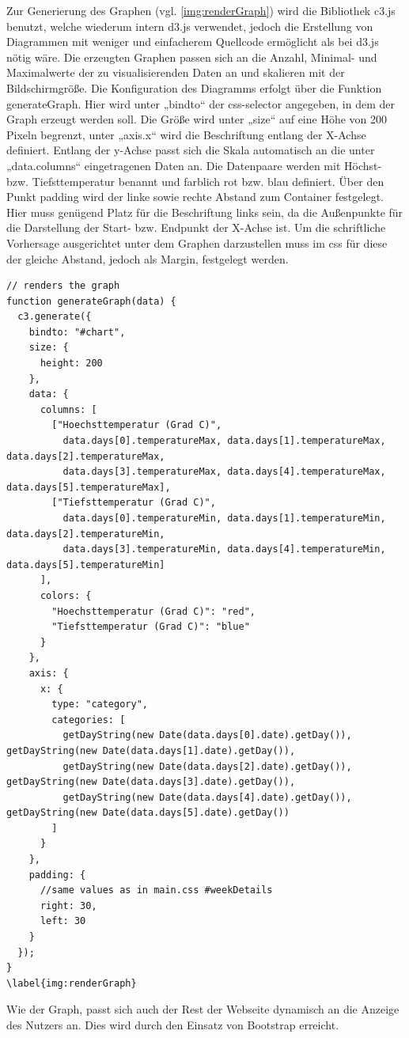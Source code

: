 Zur Generierung des Graphen (vgl. \ref{img:renderGraph}) wird die Bibliothek c3.js benutzt, welche wiederum intern d3.js verwendet, jedoch die Erstellung von Diagrammen mit weniger und einfacherem Quellcode ermöglicht als bei d3.js nötig wäre. Die erzeugten Graphen passen sich an die Anzahl, Minimal- und Maximalwerte der zu visualisierenden Daten an und skalieren mit der Bildschirmgröße. Die Konfiguration des Diagramms erfolgt über die Funktion generateGraph. Hier wird unter „bindto“ der css-selector angegeben, in dem der Graph erzeugt werden soll. Die Größe wird unter „size“ auf eine Höhe von 200 Pixeln begrenzt, unter „axis.x“ wird die Beschriftung entlang der X-Achse definiert. Entlang der y-Achse passt sich die Skala automatisch an die unter „data.columns“ eingetragenen Daten an. Die Datenpaare werden mit Höchst- bzw. Tiefsttemperatur benannt und farblich rot bzw. blau definiert. Über den Punkt padding wird der linke sowie rechte Abstand zum Container festgelegt. Hier muss genügend Platz für die Beschriftung links sein, da die Außenpunkte für die Darstellung der Start- bzw. Endpunkt der X-Achse ist. Um die schriftliche Vorhersage ausgerichtet unter dem Graphen darzustellen muss im css für diese der gleiche Abstand, jedoch als Margin, festgelegt werden.

\begin{lstlisting} 
// renders the graph
function generateGraph(data) {
  c3.generate({
    bindto: "#chart",
    size: {
      height: 200
    },
    data: {
      columns: [
        ["Hoechsttemperatur (Grad C)",
          data.days[0].temperatureMax, data.days[1].temperatureMax, data.days[2].temperatureMax,
          data.days[3].temperatureMax, data.days[4].temperatureMax, data.days[5].temperatureMax],
        ["Tiefsttemperatur (Grad C)",
          data.days[0].temperatureMin, data.days[1].temperatureMin, data.days[2].temperatureMin,
          data.days[3].temperatureMin, data.days[4].temperatureMin, data.days[5].temperatureMin]
      ],
      colors: {
        "Hoechsttemperatur (Grad C)": "red",
        "Tiefsttemperatur (Grad C)": "blue"
      }
    },
    axis: {
      x: {
        type: "category",
        categories: [
          getDayString(new Date(data.days[0].date).getDay()), getDayString(new Date(data.days[1].date).getDay()),
          getDayString(new Date(data.days[2].date).getDay()), getDayString(new Date(data.days[3].date).getDay()),
          getDayString(new Date(data.days[4].date).getDay()), getDayString(new Date(data.days[5].date).getDay())
        ]
      }
    },
    padding: {
      //same values as in main.css #weekDetails
      right: 30,
      left: 30
    }
  });
}
\label{img:renderGraph}
\end{lstlisting}

Wie der Graph, passt sich auch der Rest der Webseite dynamisch an die Anzeige des Nutzers an. Dies wird durch den Einsatz von Bootstrap erreicht. 

